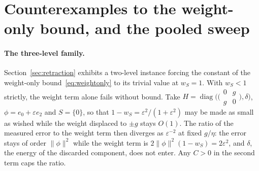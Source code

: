 

\section{Counterexamples to the weight-only bound, and the pooled sweep}
\label{app:counterex}

\paragraph{The three-level family.} Section~\ref{sec:retraction} exhibits a two-level instance forcing
the constant of the weight-only bound~\eqref{eq:weightonly} to its trivial value at $w_S=1$. With $w_S<1$ strictly, the weight term alone fails without bound. Take
$H=\operatorname{diag}\bigl(\bigl(\begin{smallmatrix}0&g\\ g&0\end{smallmatrix}\bigr),\delta\bigr)$,
$\phi=e_0+\varepsilon e_2$ and $S=\{0\}$, so that $1-w_S=\varepsilon^{2}/(1+\varepsilon^{2})$ may be
made as small as wished while the weight displaced to $\pm g$ stays $O(1)$. The ratio of the measured error to the weight term then diverges as $\varepsilon^{-2}$ at fixed $g/\eta$: the error stays of order $\lVert\phi\rVert^{2}$ while the weight term is $2\lVert\phi\rVert^{2}(1-w_S)=2\varepsilon^{2}$, and $\delta$, the energy of the discarded component, does not enter. Any $C>0$ in the second term caps the ratio.

